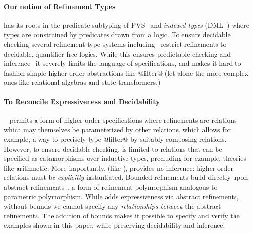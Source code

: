 \paragraph{Our notion of Refinement Types}
%
has its roots in the predicate subtyping
of PVS~\cite{Rushby98} and \emph{indexed types}
(DML~\cite{pfenningxi98}) where types are constrained
by predicates drawn from a logic.
%
To ensure decidable checking several refinement
type systems including~\citep{pfenningxi98,Dunfield07,LiquidICFP14}
restrict refinements to decidable, quantifier free logics.
%
While this ensures predictable checking and inference~\cite{LiquidPLDI08}
it severely limits the language of specifications, and makes it hard to
fashion simple higher order abstractions like @filter@ (let alone the more
complex ones like relational algebras and state transformers.)

\paragraph{To Reconcile Expressiveness and Decidability}
%
\catalyst~\citep{catalyst} permits a form of
higher order specifications where refinements
are relations which may themselves be parameterized
by other relations, which allows for example, a
way to precisely type @filter@ by suitably
composing relations.
%
However, to ensure decidable checking, \catalyst
is limited to relations that can be specified as
catamorphisms over inductive types, precluding
for example, theories like arithmetic.
More importantly, (like \fstar), \catalyst provides
no inference: higher order relations must be
\emph{explicitly} instantiated.
%
Bounded refinements build directly upon
abstract refinements~\citep{vazou13},
a form of refinement polymorphism
analogous to parametric polymorphism.
%
While \cite{vazou13} adds expressiveness via
abstract refinements, without bounds we cannot
specify any \emph{relationships between} the
abstract refinements. The addition of bounds
makes it possible to specify and verify the examples
shown in this paper,
while preserving decidability and inference.

